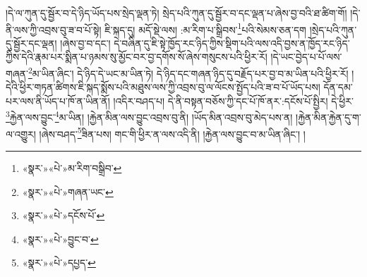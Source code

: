 །དེ་ལ་ཀུན་དུ་སྦྱོར་བ་དེ་ཉིད་ཡོད་པས་སྲེད་ལྡན་ཏེ། སྲེད་པའི་ཀུན་དུ་སྦྱོར་བ་དང་ལྡན་པ་ཞེས་བྱ་བའི་ཐ་ཚིག་གོ། །དེ་ནི་ལས་ཀྱི་འབྲས་བུ་ཟ་བ་པོ་སྟེ། ཇི་སྐད་དུ། མདོ་སྡེ་ལས། :མ་རིག་པ་སྒྲིབས་\footnote{«སྣར་»«པེ་»མ་རིག་བསྒྲིབ་}པའི་སེམས་ཅན་དག །སྲེད་པའི་ཀུན་དུ་སྦྱོར་དང་ལྡན། །ཞེས་བྱ་བ་དང་། དེ་བཞིན་དུ་ཇི་སྟེ་ཁྱོད་རང་ཉིད་ཀྱིས་སྡིག་པའི་ལས་འདི་བྱས་ན་ཁྱོད་རང་ཉིད་ཀྱིས་དེའི་རྣམ་པར་སྨིན་པ་ཉམས་སུ་མྱོང་བར་བྱ་དགོས་སོ་ཞེས་གསུངས་པའི་ཕྱིར་རོ། །དེ་ཡང་བྱེད་པ་པོ་ལས་གཞན་\footnote{«སྣར་»«པེ་»གཞན་ཡང་}མ་ཡིན་ཞིང་། དེ་ཉིད་དེ་ཡང་མ་ཡིན་ཏེ། དེ་ཉིད་དང་གཞན་ཉིད་དུ་བརྗོད་པར་བྱ་བ་མ་ཡིན་པའི་ཕྱིར་རོ། །དེའི་ཕྱིར་གཏན་ཚིགས་ཇི་སྐད་སྨོས་པའི་མཐུས་ལས་ཀྱི་འབྲས་བུ་ལ་ལོངས་སྤྱོད་པའི་ཟ་བ་པོ་ཡོད་པས། དོན་དམ་པར་ལས་ནི་ཡོད་པ་ཁོ་ན་ཡིན་ནོ། །འདིར་བཤད་པ། དེ་ནི་བསྟན་བཅོས་ཀྱི་དང་པོ་ཁོ་ནར་:དངོས་པོ་སྤྱིར། དེ་ཕྱིར་\footnote{«སྣར་»«པེ་»དངོས་པོ་}རྐྱེན་ལས་བྱུང་\footnote{«སྣར་»«པེ་»བྱུང་བ་}མ་ཡིན། །རྐྱེན་མིན་ལས་བྱུང་འབྲས་བུ་ནི། །ཡོད་མིན་འབྲས་བུ་མེད་པས་ན། །རྐྱེན་མིན་རྐྱེན་དུ་ག་ལ་འགྱུར། །ཞེས་བཤད་\footnote{«སྣར་»«པེ་»དཔྱད་}ཟིན་པས། གང་གི་ཕྱིར་ན་ལས་འདི་ནི། །རྐྱེན་ལས་བྱུང་བ་མ་ཡིན་ཞིང་། །

